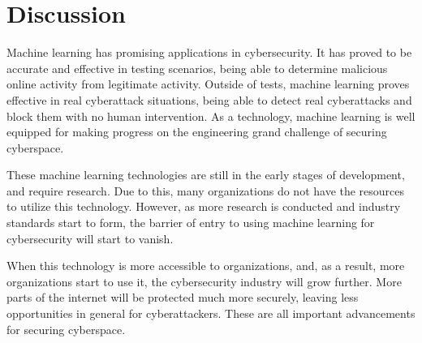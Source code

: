 \section{Discussion}
Machine learning has promising applications in cybersecurity.
It has proved to be accurate and effective in testing scenarios, being able to determine malicious online activity from legitimate activity.
Outside of tests, machine learning proves effective in real cyberattack situations, being able to detect real cyberattacks and block them with no human intervention.
As a technology, machine learning is well equipped for making progress on the engineering grand challenge of securing cyberspace.

These machine learning technologies are still in the early stages of development, and require research.
Due to this, many organizations do not have the resources to utilize this technology.
However, as more research is conducted and industry standards start to form, the barrier of entry to using machine learning for cybersecurity will start to vanish.

When this technology is more accessible to organizations, and, as a result, more organizations start to use it, the cybersecurity industry will grow further.
More parts of the internet will be protected much more securely, leaving less opportunities in general for cyberattackers.
These are all important advancements for securing cyberspace.
